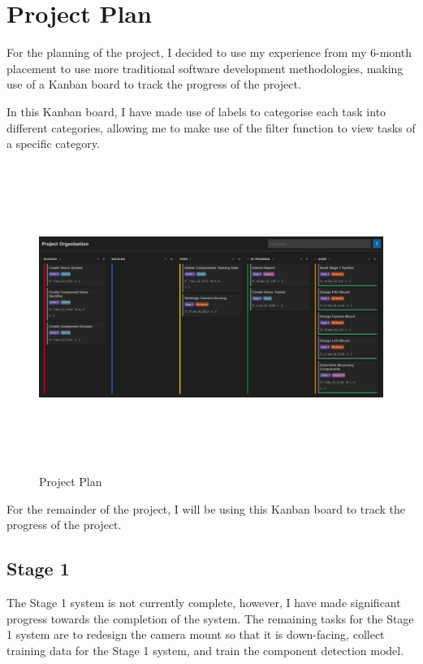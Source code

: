 \section{Project Plan}
\label{sec:projectplan}
For the planning of the project, I decided to use my experience from my 6-month placement to use more traditional software development methodologies,
making use of a Kanban board to track the progress of the project.

In this Kanban board, I have made use of labels to categorise each task into different categories, allowing me to make use
of the filter function to view tasks of a specific category.

\begin{figure}[t]
  \begin{minipage}[t]{\textwidth}
    \centering
    \includegraphics[width=\textwidth,height=10cm,keepaspectratio]{imgs/software/projectplan.jpg}
    \caption{Project Plan}
  \end{minipage}
  \hfill 
\end{figure}

For the remainder of the project, I will be using this Kanban board to track the progress of the project. 
 \subsection{Stage 1}
The Stage 1 system is not currently complete, however, I have made significant progress towards the completion of the system. The remaining
tasks for the Stage 1 system are to redesign the camera mount so that it is down-facing, collect training data for the Stage 1 system, and
train the component detection model. 

